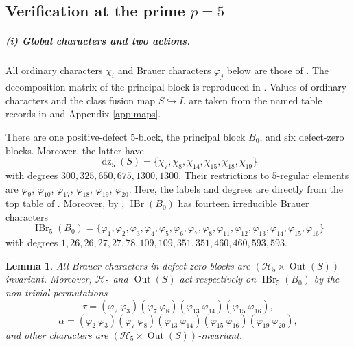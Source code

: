 \documentclass[11pt,a4paper]{article}
\numberwithin{equation}{section}
\newtheorem{lemma}[theorem]{Lemma}
\theoremstyle{definition}
\theoremstyle{remark}
\newcommand{\IBr}{\operatorname{IBr}}
\newcommand{\Out}{\operatorname{Out}}
\newcommand{\dz}{\operatorname{dz}}
\newcommand{\HH}{\mathcal H}
\begin{document}
\subsection{Verification at the prime \texorpdfstring{$p=5$}{p=5}}\label{sec:p5}
\subparagraph{(i) Global characters and two actions.}
All ordinary characters \(\chi_i\) and Brauer characters \(\varphi_j\) below are those of \cite{T}. 
The decomposition matrix of the principal block is reproduced in \cite[Block.1]{T}. Values of ordinary characters and the class fusion map \(S\hookrightarrow L\) are taken from the
named table records in \cite{OrdData} and Appendix \ref{app:maps}. 

There are one positive-defect \(5\)-block, the principal block \(B_0\), and six defect-zero blocks.  Moreover, the latter have
\begin{equation}\label{p5:dz}
 \dz_5(S)=\{\chi_7,\chi_8,\chi_{14},\chi_{15},\chi_{18},\chi_{19}\}
\end{equation}
with degrees $300,325,650,675,1300,1300$.
Their restrictions to $5$-regular elements are
$\varphi_9$, $\varphi_{10}$, $\varphi_{17}$, $\varphi_{18}$, $\varphi_{19}$, $\varphi_{20}$.
Here, the labels and degrees are directly from the top table of \cite{T}. Moreover, by \cite[Block.1]{T},  $\IBr(B_0)$ has fourteen irreducible Brauer characters
\begin{equation*}%
\IBr_5(B_0)=\{\varphi_1,\varphi_2,\varphi_3,\varphi_4,\varphi_5,\varphi_6,
\varphi_7,\varphi_8,\varphi_{11},\varphi_{12},\varphi_{13},\varphi_{14},\varphi_{15},\varphi_{16}\}
\end{equation*}
with degrees $1,26,26,27,27,78,109,109,351,351,460,460,593,593$.
\begin{lemma}\label{lem:p=5 global characters}
All Brauer characters in defect-zero blocks are $(\HH_5\times \Out(S))$-invariant. Moreover, $\HH_5$ and $\Out(S)$ act respectively on $\IBr_5(B_0)$ by the non-trivial permutations 
\[
\tau
=(\varphi_2\ \varphi_3)(\varphi_7\ \varphi_8)
 (\varphi_{13}\ \varphi_{14})(\varphi_{15}\ \varphi_{16}),
\]
\[
\alpha=(\varphi_2\ \varphi_3)(\varphi_7\ \varphi_8)
 (\varphi_{13}\ \varphi_{14})(\varphi_{15}\ \varphi_{16})
 (\varphi_{19}\ \varphi_{20}),
\] 
and other characters are $(\HH_5\times\Out(S))$-invariant.
\end{lemma}
\end{document}
